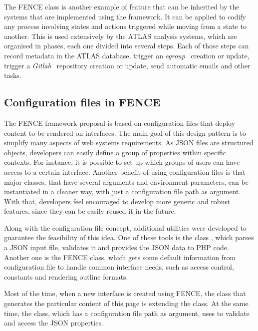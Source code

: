 The FENCE  class is another example of feature that can be inherited by the systems that are implemented using the framework.
It can be applied to codify any process involving states and actions triggered while moving from a state to another.
This is used extensively by the ATLAS analysis systems, which are organised in phases, each one divided into several steps.
Each of those steps can record metadata in the ATLAS database, trigger an \textit{egroup}~\cite{egroups} creation or update, trigger a \textit{Gitlab}~\cite{gitlab} repository creation or update, send automatic emails and other tasks. 


\subsection{Configuration files in FENCE}%
\label{sec:Configuration_files_in_FENCE}

The FENCE framework proposal is based on configuration files that deploy content to be rendered on interfaces.
The main goal of this design pattern is to simplify many aspects of web systems requirements.
As JSON files are structured objects, developers can easily define a group of properties within specific contexts.
For instance, it is possible to set up which groups of users can have access to a certain interface.
Another benefit of using configuration files is that major classes, that have several arguments and environment parameters, can be instantiated in a cleaner way, with just a configuration file path as argument.
With that, developers feel encouraged to develop more generic and robust features, since they can be easily reused it in the future.

Along with the configuration file concept, additional utilities were developed to guarantee the feasibility of this idea.
One of these tools is the class , which parses a JSON input file, validates it and provides the JSON data to PHP code.
Another one is the FENCE  class, which gets some default information from configuration file to handle common interface needs, such as access control, constants and rendering outline formats.

Most of the time, when a new interface is created using FENCE, the class that generates the particular content of this page is extending the  class.
At the same time, the  class, which has a configuration file path as argument, uses  to validate and access the JSON properties.
